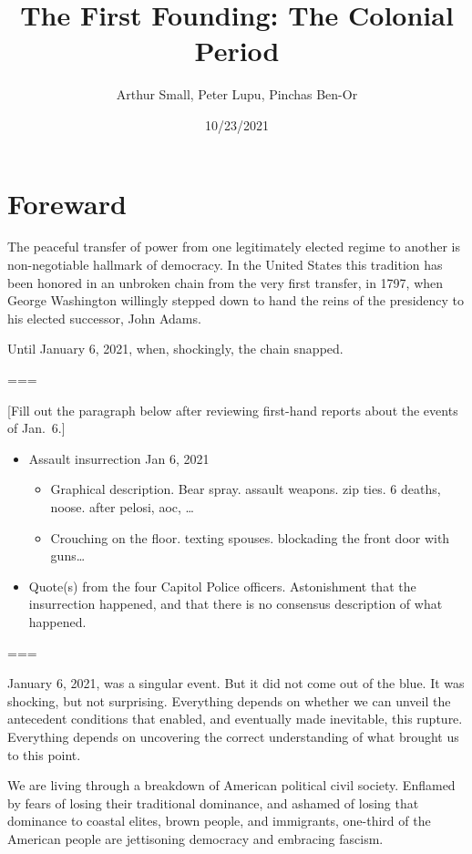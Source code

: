 \documentclass[
]{book}
\title{The First Founding: The Colonial Period}
\author{Arthur Small, Peter Lupu, Pinchas Ben-Or}
\date{10/23/2021}
\providecommand{\tightlist}{%
  \setlength{\itemsep}{0pt}\setlength{\parskip}{0pt}}
\begin{document}
\maketitle

{
\setcounter{tocdepth}{1}
\tableofcontents
}
\hypertarget{foreward}{%
\chapter*{Foreward}\label{foreward}}

The peaceful transfer of power from one legitimately elected regime to another is non-negotiable hallmark of democracy. In the United States this tradition has been honored in an unbroken chain from the very first transfer, in 1797, when George Washington willingly stepped down to hand the reins of the presidency to his elected successor, John Adams.

Until January 6, 2021, when, shockingly, the chain snapped.

===

{[}Fill out the paragraph below after reviewing first-hand reports about the events of Jan.~6.{]}

\begin{itemize}
\tightlist
\item
  Assault insurrection Jan 6, 2021

  \begin{itemize}
  \tightlist
  \item
    Graphical description. Bear spray. assault weapons. zip ties. 6 deaths, noose. after pelosi, aoc, \ldots{}
  \item
    Crouching on the floor. texting spouses. blockading the front door with guns\ldots{}
  \end{itemize}
\item
  Quote(s) from the four Capitol Police officers. Astonishment that the insurrection happened, and that there is no consensus description of what happened.
\end{itemize}

===

January 6, 2021, was a singular event. But it did not come out of the blue. It was shocking, but not surprising. Everything depends on whether we can unveil the antecedent conditions that enabled, and eventually made inevitable, this rupture. Everything depends on uncovering the correct understanding of what brought us to this point.

We are living through a breakdown of American political civil society. Enflamed by fears of losing their traditional dominance, and ashamed of losing that dominance to coastal elites, brown people, and immigrants, one-third of the American people are jettisoning democracy and embracing fascism.
\end{document}
